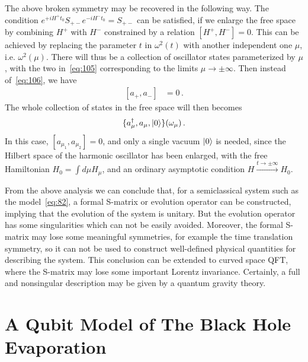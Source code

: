 \documentclass[12pt,a4paper]{article}
\begin{document}
The above broken symmetry may be recovered in the following way. The condition $e^{+iH^+ t_0}S_{+-}e^{-iH^-t_0}=S_{+-}$
can be satisfied, if we enlarge the free space by combining $H^+$ with $H^-$ constrained by a relation $[H^+,H^-]=0$. This
can be achieved by replacing the parameter $t$ in $\omega^2(t)$ with
another independent one $\mu$, i.e. $\omega^2(\mu)$. There will
thus be a collection of oscillator states parameterized by $\mu$,
with the two in~\eqref{eq:105} corresponding to the limits
$\mu\rightarrow\pm \infty$. Then instead of~\eqref{eq:106}, we have
\begin{equation}
\label{eq:110}
\begin{split}
[a_{+},a_{-}] &= 0 \,.
\end{split}
\end{equation}
The whole collection of states in the free space will then becomes
\begin{equation}
\label{eq:111}
\begin{split}
\{a_{\mu}^\dag,a_{\mu},\arrowvert0\rangle\}(\omega_{\mu}) \,.
\end{split}
\end{equation}
In this case, $[a_{\mu_1},a_{\mu_2}]= 0$, and only a single vacuum $\arrowvert0\rangle$ is needed, since the Hilbert space
of the harmonic oscillator has been enlarged, with the free Hamiltonian $H_0=\int d\mu
H_{\mu}$, and an ordinary asymptotic condition
$H\stackrel{t\rightarrow\pm \infty}{\longrightarrow} H_0$.

From the above analysis we can conclude that, for a
semiclassical system such as the model~\eqref{eq:82}, a formal S-matrix or evolution
operator can be constructed, implying that the evolution of the system is unitary.
But the evolution operator has some singularities which can not be easily
avoided. Moreover, the formal S-matrix may lose some meaningful
symmetries, for example the time translation symmetry, so it
can not be used to construct well-defined physical quantities for describing the system. This conclusion can be extended
to curved space QFT, where the S-matrix may lose some important
Lorentz invariance. Certainly, a full and nonsingular description may be given by a quantum gravity theory.



\section{ A Qubit Model of The Black Hole Evaporation}
\label{sec:qubit}
\end{document}
